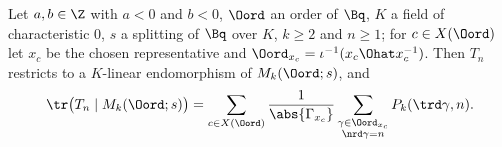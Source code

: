 Let $a,b\in\Z$ with $a<0$ and $b<0$, $\Oord$ an order of $\Bq$, $K$ a field of characteristic $0$, $s$ a splitting of $\Bq$ over $K$, $k\ge2$
and $n\ge1$; for $c\in X(\Oord)$ let $x_c$ be the chosen representative and $\Oord_{x_c}=\iota^{-1}(x_c\Ohat x_c^{-1})$. Then $T_n$ restricts to
a $K$-linear endomorphism of $M_k(\Oord;s)$, and
\[
  \tr\bigl(T_n\mid M_k(\Oord;s)\bigr)=\sum_{c\in X(\Oord)}\frac1{\abs{\Gamma_{x_c}}}\sum_{\substack{\gamma\in\Oord_{x_c}\\ \nrd\gamma=n}}P_k(\trd\gamma,n).
\]
